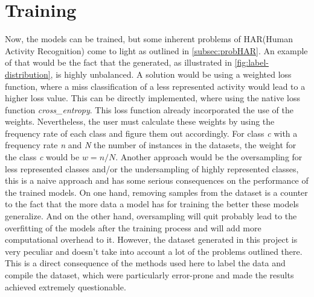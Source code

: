 	\section{Training}\label{section:training}
		Now, the models can be trained, but some inherent problems of HAR(Human Activity Recognition) come to light as outlined in \ref{subsec:probHAR}. An example of that would be the fact that the generated, as illustrated in \ref{fig:label-distribution}, is highly unbalanced. A solution would be using a weighted loss function, where a miss classification of a less represented activity would lead to a higher loss value. This can be directly implemented, where using the native loss function \textit{cross\_entropy}. This loss function already incorporated the use of the weights. Nevertheless, the user must calculate these weights by using the frequency rate of each class and figure them out accordingly. For class \textit{c} with a frequency rate \textit{n} and \textit{N} the number of instances in the datasets, the weight for the class \textit{c} would be $w=n/N$. Another approach would be the oversampling for less represented classes and/or the undersampling of highly represented classes, this is a naive approach and has some serious consequences on the performance of the trained models. On one hand, removing samples from the dataset is a counter to the fact that the more data a model has for training the better these models generalize. And on the other hand, oversampling will quit probably lead to the overfitting of the models after the training process and will add more computational overhead to it.\newline
		However, the dataset generated in this project is very peculiar and doesn't take into account a lot of the problems outlined there. This is a direct consequence of the methods used here to label the data and compile the dataset, which were particularly error-prone and made the results achieved extremely questionable.
